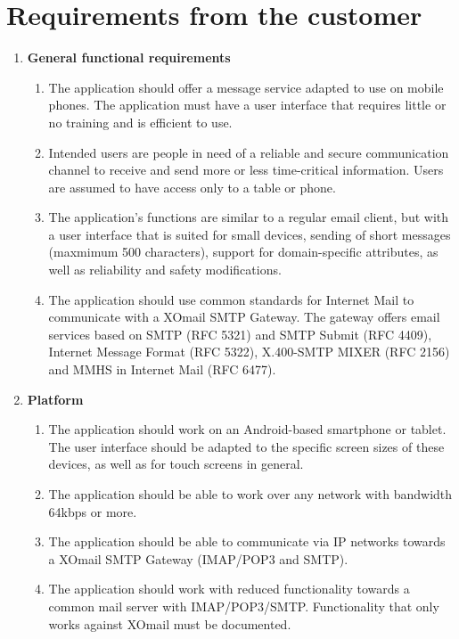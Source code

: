 

\section{Requirements from the customer}\label{se:cusreq}

\begin{enumerate}
\item{} \textbf{General functional requirements}
\begin{enumerate}
\item{}The application should offer a message service adapted to use on mobile phones. The application must have a user interface that requires little or no training and is efficient to use.
\item{}Intended users are people in need of a reliable and secure communication channel to receive and send more or less time-critical information. Users are assumed to have access only to a table or phone.
\item{}The application's functions are similar to a regular email client, but with a user interface that is suited for small devices, sending of short messages (maxmimum 500 characters), support for domain-specific attributes, as well as reliability and safety modifications.
\item{}The application should use common standards for Internet Mail to communicate with a XOmail SMTP Gateway. The gateway offers email services based on SMTP (RFC 5321) and SMTP Submit (RFC 4409), Internet Message Format (RFC 5322), X.400-SMTP MIXER (RFC 2156) and MMHS in Internet Mail (RFC 6477). 
\end{enumerate}
\item{}\textbf{Platform}
\begin{enumerate}
\item{}The application should work on an Android-based smartphone or tablet. The user interface should be adapted to the specific screen sizes of these devices, as well as for touch screens in general.
\item{}The application should be able to work over any network with bandwidth 64kbps or more.
\item{}The application should be able to communicate via IP networks towards a XOmail SMTP Gateway (IMAP/POP3 and SMTP).
\item{}The application should work with reduced functionality towards a common mail server with IMAP/POP3/SMTP. Functionality that only works against XOmail must be documented.
\end{enumerate}

\end{enumerate}
